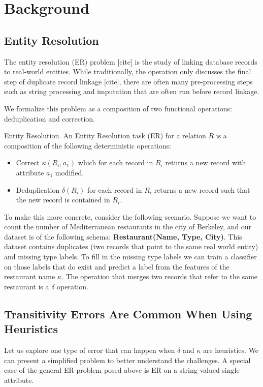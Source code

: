 \section{Background}

\subsection{Entity Resolution}
The entity resolution (ER) problem [cite] is the study of linking database records to real-world entities.
While traditionally, the operation only discusses the final step of duplicate record linkage [cite], there are often
many pre-processing steps such as string processing and imputation that are often run before record linkage.

We formalize this problem as a composition of two functional operations: deduplication and correction.
\begin{definition} Entity Resolution. 
An Entity Resolution task (ER) for a relation $R$ is a composition of the 
following deterministic operations:
\begin{itemize}
\item Correct $\kappa(R_i,a_{1})$ which for each record in $R_i$ returns a new record with attribute $a_{1}$ modified.
\item Deduplication $\delta(R_i)$ for each record in $R_i$ returns a new record such that the new record is contained in $R_i$.
\end{itemize}
\end{definition}

To make this more concrete, consider the following scenario. 
Suppose we want to count the number of Mediterranean restaurants in the city of Berkeley, and 
our dataset is of the following schema: \textbf{Restaurant(Name, Type, City)}.
This dataset contains duplicates (two records that point to the same real world entity) and missing type labels.
To fill in the missing type labels we can train a classifier on those labels that do exist and predict a label from the features of the restaurant name $\kappa$.
The operation that merges two records that refer to the same restaurant is a $\delta$ operation.

\subsection{Transitivity Errors Are Common When Using Heuristics}
Let us explore one type of error that can happen when $\delta$ and $\kappa$ are heuristics.
We can present a simplified problem to better understand the challenges.
A special case of the general ER problem posed above is ER on a string-valued single attribute.

